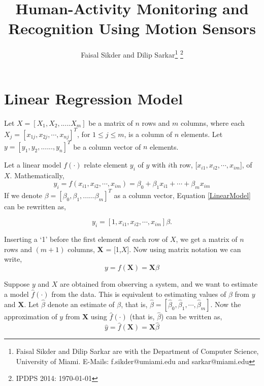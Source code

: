 \documentclass[10pt,myheadings]{IEEEtran}
\newcommand{\matr}[1]{\bm{#1}}
\begin{document}
\title{Human-Activity Monitoring and Recognition Using Motion Sensors}
\author{Faisal Sikder and Dilip Sarkar\thanks{Faisal Sikder and Dilip Sarkar
are with the Department of Computer Science, University of Miami.  E-Mails:
 f.sikder@umiami.edu and sarkar@miami.edu}
\thanks{IPDPS 2014: \today }}
\maketitle
	
	\section{Linear Regression Model}
	\label{LinearRegressionModel}
	Let $X = [X_1,X_2,.....X_m]$  be a matrix of $n$ rows and $m$ columns, where each $X_j=[x_{1j},x_{2j}, \cdots, x_{nj}]^T$, for $1\le j\le m$, is a column of $n$ elements. Let $y = [y_1,y_2,......,y_n]^T$ be a column vector of $n$ elements.
	
	Let a linear model $f(\cdot)$ relate  element $y_i$ of $y$ with $i$th row, 
	[$x_{i1}, x_{i2},\cdots , x_{im}$], of $X$. Mathematically,
	\begin{equation}
	y_i =  f(x_{i1},x_{i2},\cdots, x_{im}) =\beta_0+\beta_1 x_{i1}+\cdots +\beta_m x_{im} 
	\label{LinearModel}
	\end{equation}
	If we denote $ \beta =[\beta_0,\beta_1,......\beta_m]^T$ as a column vector, Equation \ref{LinearModel} can be rewritten as,
  
	$$
	       y_i =[1,x_{i1},x_{i2},\cdots,x_{im}]\beta.
 $$
	   
	Inserting a `1' before the first element of each row of $X$, we get a matrix of $n$ rows and $(m+1)$ columns, 
	$\boldsymbol{X}$ = [1,$X$]. Now using matrix notation we can write,
	\begin{equation}
		\label{equ:LinearModelMatrixForm}
	y = f(\boldsymbol{X}) = \matr{X}\beta
	\end{equation}
	
	Suppose $y$ and $X$ are obtained from observing a system, and we want to estimate a model $\hat{f}(\cdot)$ from the data. This is equivalent to estimating values of $\beta$ from $y$ and $\matr{X}$. Let  $\hat{\beta}$ denote  an estimate of $\beta$, that is, $\hat{\beta} = [\hat{\beta}_0, \hat{\beta}_1, \cdots,\hat{\beta}_m]$. 
	Now the approximation of $y$ from $\matr{X}$ using $\hat{f}({\cdot})$ (that is, $\hat{\beta}$)	can be written as,
	\begin{equation}
		\label{equ:function-with-beta}
	\hat{y} = \hat{f}(\boldsymbol{X}) = \matr{X}\hat{\beta}
	\end{equation}
	
\end{document}
